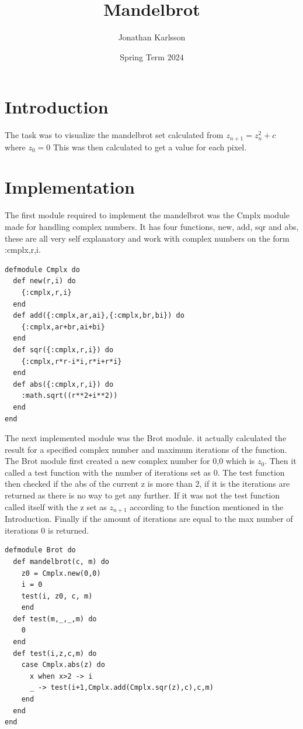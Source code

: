 \documentclass[a4paper,11pt]{article}
\begin{document}
\title{
    \textbf{Mandelbrot}
}
\author{Jonathan Karlsson}
\date{Spring Term 2024}

\maketitle

\section*{Introduction}
The task was to visualize the mandelbrot set calculated from $z_{n+1} = z_n^2+c$ where $z_0=0$ This was then calculated to get a value for each pixel.


\section*{Implementation}
The first module required to implement the mandelbrot was the Cmplx module made for handling complex numbers. 
It has four functions, new, add, sqr and abs, these are all very self explanatory and work with complex numbers on the form 
{:cmplx,r,i}.
\begin{verbatim}
defmodule Cmplx do
  def new(r,i) do
    {:cmplx,r,i}
  end
  def add({:cmplx,ar,ai},{:cmplx,br,bi}) do
    {:cmplx,ar+br,ai+bi}
  end
  def sqr({:cmplx,r,i}) do
    {:cmplx,r*r-i*i,r*i+r*i}
  end
  def abs({:cmplx,r,i}) do
    :math.sqrt((r**2+i**2))
  end
end  
\end{verbatim}
The next implemented module was the Brot module. it actually calculated the result for a specified complex number and maximum iterations of the function. 
The Brot module first created a new complex number for 0,0 which is $z_0$. Then it called a test function with the number of iterations set as 0. 
The test function then checked if the abs of the current z is more than 2, if it is the iterations are returned as there is no way to get any further. If it was not the test function called itself with the z set as $z_{n+1}$ according to the function mentioned in the Introduction.
Finally if the amount of iterations are equal to the max number of iterations 0 is returned. 
\begin{verbatim}
defmodule Brot do
  def mandelbrot(c, m) do
    z0 = Cmplx.new(0,0)
    i = 0
    test(i, z0, c, m)
    end
  def test(m,_,_,m) do
    0
  end
  def test(i,z,c,m) do
    case Cmplx.abs(z) do
      x when x>2 -> i
      _ -> test(i+1,Cmplx.add(Cmplx.sqr(z),c),c,m)
    end
  end 
end
\end{verbatim}
\end{document}
